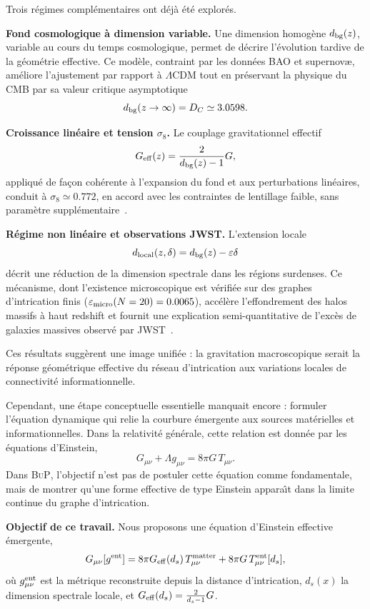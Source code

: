 \documentclass[11pt]{article}
\newcommand{\DC}{D_C}
\newcommand{\Geff}{G_{\rm eff}}
\newcommand{\sig}{\sigma_8}
\newcommand{\LCDM}{\Lambda\mathrm{CDM}}
\newcommand{\BuP}{\textsc{BuP}}
\newcommand{\ent}{\rm ent}
\begin{document}
Trois r\'egimes compl\'ementaires ont d\'ej\`a \'et\'e explor\'es.

\textbf{Fond cosmologique \`a dimension variable.}
Une dimension homog\`ene $d_{\rm bg}(z)$, variable au cours du temps cosmologique,
permet de d\'ecrire l'\'evolution tardive de la g\'eom\'etrie effective. Ce mod\`ele,
contraint par les donn\'ees BAO et supernovæ, am\'eliore l'ajustement par rapport
\`a $\LCDM$ tout en pr\'eservant la physique du CMB par sa valeur critique asymptotique
\[
d_{\rm bg}(z\to\infty)=\DC\simeq 3.0598.
\]

\textbf{Croissance lin\'eaire et tension $\sigma_8$.}
Le couplage gravitationnel effectif
\[
\Geff(z)=\frac{2}{d_{\rm bg}(z)-1}G,
\]
appliqu\'e de fa\c{c}on coh\'erente \`a l'expansion du fond et aux perturbations
lin\'eaires, conduit \`a $\sig\simeq 0.772$, en accord avec les contraintes de
lentillage faible, sans param\`etre suppl\'ementaire~\cite{hamdad2026p3}.

\textbf{R\'egime non lin\'eaire et observations JWST.}
L'extension locale
\[
d_{\rm local}(z,\delta)=d_{\rm bg}(z)-\varepsilon\delta
\]
d\'ecrit une r\'eduction de la dimension spectrale dans les r\'egions surdenses.
Ce m\'ecanisme, dont l'existence microscopique est v\'erifi\'ee sur des graphes
d'intrication finis (\(\varepsilon_{\rm micro}(N=20)=0.0065\)),
acc\'el\`ere l'effondrement des halos massifs \`a haut redshift et fournit une
explication semi-quantitative de l'exc\`es de galaxies massives observ\'e par
JWST~\cite{hamdad2026p4}.

Ces r\'esultats sugg\`erent une image unifi\'ee : la gravitation macroscopique
serait la r\'eponse g\'eom\'etrique effective du r\'eseau d'intrication aux
variations locales de connectivit\'e informationnelle.

Cependant, une \'etape conceptuelle essentielle manquait encore : formuler
l'\'equation dynamique qui relie la courbure \'emergente aux sources mat\'erielles
et informationnelles. Dans la relativit\'e g\'en\'erale, cette relation est donn\'ee
par les \'equations d'Einstein,
\[
G_{\mu\nu}+\Lambda g_{\mu\nu}=8\pi G\,T_{\mu\nu}.
\]
Dans \BuP, l'objectif n'est pas de postuler cette \'equation comme fondamentale,
mais de montrer qu'une forme effective de type Einstein appara\^{\i}t dans la
limite continue du graphe d'intrication.

\textbf{Objectif de ce travail.}
Nous proposons une \'equation d'Einstein effective \'emergente,
\[
G_{\mu\nu}[g^{\ent}]
=
8\pi\Geff(d_s)\,T_{\mu\nu}^{\rm matter}
+
8\pi G\,T_{\mu\nu}^{\ent}[d_s],
\]
o\`u $g^{\ent}_{\mu\nu}$ est la m\'etrique reconstruite depuis la distance
d'intrication, $d_s(x)$ la dimension spectrale locale, et
$\Geff(d_s)=\frac{2}{d_s-1}G$.
\end{document}
